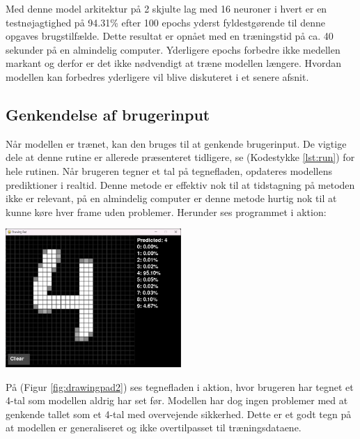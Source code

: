 \documentclass{article}
\newcommand{\figureref}[1]{(Figur \ref{#1})}
\newcommand{\listingref}[1]{(Kodestykke \ref{#1})}
\begin{document}
Med denne model arkitektur på 2 skjulte lag med 16 neuroner i hvert er en testnøjagtighed på 94.31\% efter 100 epochs yderst fyldestgørende til denne opgaves brugstilfælde. Dette resultat er opnået med en træningstid på ca. 40 sekunder på en almindelig computer. Yderligere epochs forbedre ikke medellen markant og derfor er det ikke nødvendigt at træne modellen længere. Hvordan modellen kan forbedres yderligere vil blive diskuteret i et senere afsnit.
\subsection{Genkendelse af brugerinput}
Når modellen er trænet, kan den bruges til at genkende brugerinput. De vigtige dele at denne rutine er allerede præsenteret tidligere, se \listingref{lst:run} for hele rutinen. Når brugeren tegner et tal på tegnefladen, opdateres modellens prediktioner i realtid. Denne metode er effektiv nok til at tidstagning på metoden ikke er relevant, på en almindelig computer er denne metode hurtig nok til at kunne køre hver frame uden problemer. Herunder ses programmet i aktion:
\begin{center}
  \includegraphics[width=0.5\textwidth]{drawingpad2.png}
  \label{fig:drawingpad2}
\end{center}
På \figureref{fig:drawingpad2} ses tegnefladen i aktion, hvor brugeren har tegnet et 4-tal som modellen aldrig har set før. Modellen har dog ingen problemer med at genkende tallet som et 4-tal med overvejende sikkerhed. Dette er et godt tegn på at modellen er generaliseret og ikke overtilpasset til træningsdataene.
\end{document}
